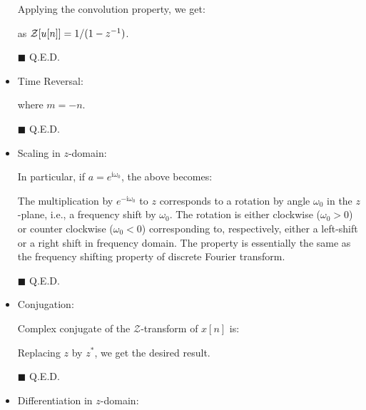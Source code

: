 \begin{itemize}
\begin{dem}
		Applying the convolution property, we get:
		
		as ${\cal Z}[u[n]]=1/(1-z^{-1})$.
		\begin{flushright}
			$\blacksquare$  Q.E.D.
		\end{flushright}
		\end{dem}
		
		\item Time Reversal:
		
		\begin{dem}
		
		where $m=-n$.
		\begin{flushright}
			$\blacksquare$  Q.E.D.
		\end{flushright}
		\end{dem}
		
		\item Scaling in $z$-domain:
		
		
		\begin{dem}
		
		In particular, if $a=e^{\mathrm{i}\omega_0}$, the above becomes:
		
		The multiplication by $e^{-\mathrm{i}\omega_0}$ to $z$ corresponds to a rotation by angle $\omega_0$ in the $z$-plane, i.e., a frequency shift by $\omega_0$. The rotation is either clockwise ($\omega_0>0$) or counter clockwise ($\omega_0<0$) corresponding to, respectively, either a left-shift or a right shift in frequency domain. The property is essentially the same as the frequency shifting property of discrete Fourier transform.
		\begin{flushright}
			$\blacksquare$  Q.E.D.
		\end{flushright} 
		\end{dem}
		
		\item Conjugation:
		
		\begin{dem}
		Complex conjugate of the $\mathcal{Z}$-transform of $x[n]$ is:
		
		Replacing $z$ by $z^*$, we get the desired result.
		\begin{flushright}
			$\blacksquare$  Q.E.D.
		\end{flushright}
		\end{dem}
		
		\item Differentiation in $z$-domain:
		
		\begin{dem}
		

\end{dem}
\end{itemize}
